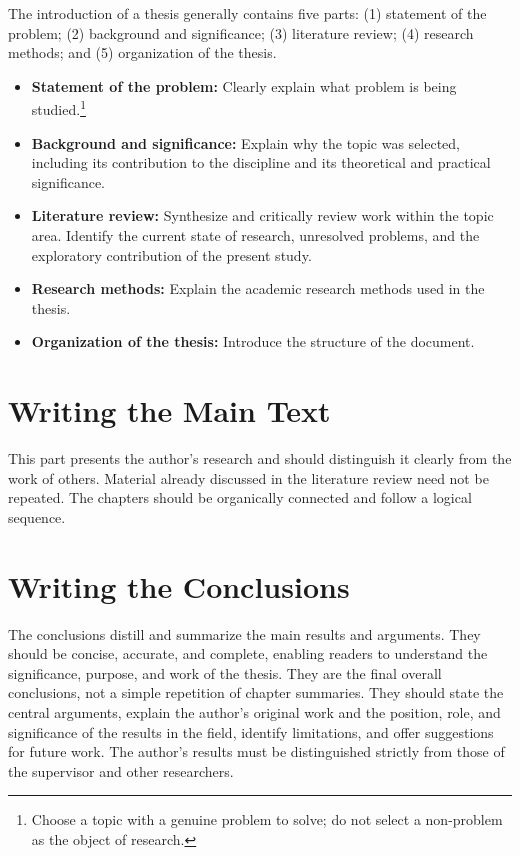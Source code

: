 \documentclass{thuthesis}
\begin{document}
The introduction of a thesis generally contains five parts: (1) statement of the
problem; (2) background and significance; (3) literature review; (4) research
methods; and (5) organization of the thesis.
\begin{itemize}
  \item \textbf{Statement of the problem:} Clearly explain what
    problem is being studied.\footnote{Choose a topic with a genuine
    problem to solve; do not select a non-problem as the object of research.}
  \item \textbf{Background and significance:} Explain why the topic
    was selected, including its contribution to the discipline and
    its theoretical and practical significance.
  \item \textbf{Literature review:} Synthesize and critically review
    work within the topic area. Identify the current state of
    research, unresolved problems, and the exploratory contribution
    of the present study.
  \item \textbf{Research methods:} Explain the academic research
    methods used in the thesis.
  \item \textbf{Organization of the thesis:} Introduce the structure
    of the document.
\end{itemize}

\section{Writing the Main Text}

This part presents the author's research and should distinguish it clearly from
the work of others. Material already discussed in the literature review need not
be repeated. The chapters should be organically connected and follow a logical
sequence.

\section{Writing the Conclusions}

The conclusions distill and summarize the main results and arguments.
They should
be concise, accurate, and complete, enabling readers to understand the
significance, purpose, and work of the thesis. They are the final overall
conclusions, not a simple repetition of chapter summaries. They should state the
central arguments, explain the author's original work and the
position, role, and
significance of the results in the field, identify limitations, and offer
suggestions for future work. The author's results must be distinguished strictly
from those of the supervisor and other researchers.
\end{document}
